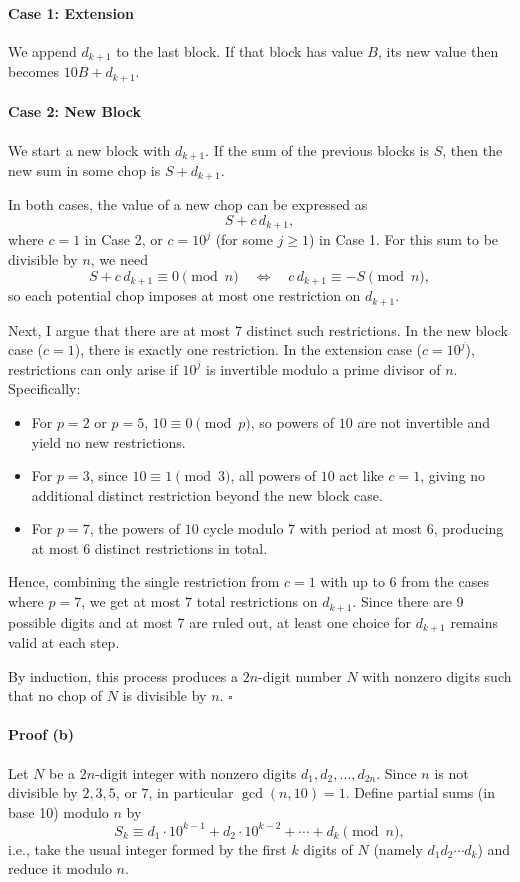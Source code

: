 \documentclass[10pt]{article}
\theoremstyle{plain}
\theoremstyle{definition}
\theoremstyle{remark}
\begin{document}
\paragraph{Case 1: Extension} We append \(d_{k+1}\) to the last block. If that block has value \(B\), its new value then becomes \(10B+d_{k+1}\).
\paragraph{Case 2: New Block} We start a new block with \(d_{k+1}\). If the sum of the previous blocks is \(S\), then the new sum in some chop is \(S + d_{k+1}\).

In both cases, the value of a new chop can be expressed as
\[
S + c\,d_{k+1},
\]
where \(c=1\) in Case 2, or \(c=10^j\) (for some \(j\geqslant1\)) in Case 1. For this sum to be divisible by \(n\), we need
\[
S + c\,d_{k+1} \equiv 0 \pmod{n}
\quad\Longleftrightarrow\quad
c\,d_{k+1} \equiv -S \pmod{n},
\]
so each potential chop imposes at most one restriction on \(d_{k+1}\).

Next, I argue that there are at most 7 distinct such restrictions. In the new block case (\(c=1\)), there is exactly one restriction. In the extension case (\(c=10^j\)), restrictions can only arise if \(10^j\) is invertible modulo a prime divisor of \(n\). Specifically:
\begin{itemize}
\item For \(p=2\) or \(p=5\), \(10\equiv 0\pmod{p}\), so powers of \(10\) are not invertible and yield no new restrictions.
\item For \(p=3\), since \(10 \equiv 1\pmod{3}\), all powers of \(10\) act like \(c=1\), giving no additional distinct restriction beyond the new block case.
\item For \(p=7\), the powers of \(10\) cycle modulo 7 with period at most 6, producing at most 6 distinct restrictions in total.
\end{itemize}
Hence, combining the single restriction from \(c=1\) with up to 6 from the cases where \(p=7\), we get at most \(7\) total restrictions on \(d_{k+1}\). Since there are 9 possible digits and at most 7 are ruled out, at least one choice for \(d_{k+1}\) remains valid at each step.

By induction, this process produces a \(2n\)-digit number \(N\) with nonzero digits such that no chop of \(N\) is divisible by \(n\). \(\square\)


\paragraph{Proof (b)} Let \(N\) be a \(2n\)-digit integer with nonzero digits \(d_1,d_2,\dots,d_{2n}\).  
Since \(n\) is not divisible by \(2,3,5\), or \(7\), in particular \(\gcd(n,10)=1\).  
Define partial sums (in base 10) modulo \(n\) by
\[
S_k \equiv d_1 \cdot 10^{k-1} + d_2 \cdot 10^{k-2} + \cdots + d_k \pmod{n},
\]
i.e., take the usual integer formed by the first \(k\) digits of \(N\) (namely \(d_1d_2\cdots d_k\)) and reduce it modulo \(n\).
\end{document}
